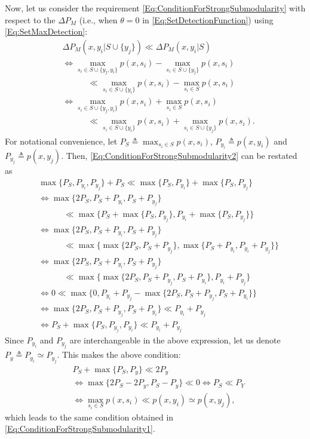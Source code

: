 \documentclass[letterpaper, 10 pt, conference]{ieeeconf}
\begin{document}
Now, let us consider the requirement \eqref{Eq:ConditionForStrongSubmodularity} with respect to the $\Delta P_M$ (i.e., when $\theta = 0$ in \eqref{Eq:SetDetectionFunction}) using \eqref{Eq:SetMaxDetection}:
\begin{align}
    &\Delta P_M(x,y_i \vert S \cup \{y_j\}) \ll \Delta P_M(x, y_i \vert S) \nonumber\\
    & \iff 
    \max_{s_i\in S\cup\{y_j,y_i\}} p(x,s_i) - \max_{s_i\in S\cup\{y_j\}} p(x,s_i) \nonumber \\
    &\quad \quad \quad \ll
    \max_{s_i\in S\cup\{y_i\}} p(x,s_i) - \max_{s_i\in S} p(x,s_i)\nonumber\\
    &\iff \max_{s_i\in S\cup\{y_j,y_i\}} p(x,s_i) + \max_{s_i\in S} p(x,s_i) 
    \nonumber\\ \label{Eq:ConditionForStrongSubmodularity2}
    &\quad \quad \quad \ll \max_{s_i\in S\cup\{y_i\}} p(x,s_i) + \max_{s_i\in S\cup\{y_j\}} p(x,s_i).
\end{align}
For notational convenience, let $P_S \triangleq \max_{s_i\in S} p(x,s_i)$, $P_{y_i}\triangleq p(x,y_i)$ and $P_{y_j}\triangleq p(x,y_j)$. Then, \eqref{Eq:ConditionForStrongSubmodularity2} can be restated as
\begin{align*}
    &\max\{P_S,P_{y_i},P_{y_j}\} + P_S \ll \max\{P_S,P_{y_i}\} + \max\{P_S,P_{y_j}\} \\
    &\iff 
    \max\{2P_S,P_S+P_{y_i},P_S+P_{y_j}\} \\ 
    &\quad \quad \quad \ll \max\{P_S+\max\{P_S,P_{y_j}\},P_{y_i}+\max\{P_S,P_{y_j}\}\}\\
    &\iff 
    \max\{2P_S,P_S+P_{y_i},P_S+P_{y_j}\} \\ 
    &\quad \quad \quad  \ll \max\{\max\{2P_S,P_S+P_{y_j}\},\max\{P_S+P_{y_i},P_{y_i}+P_{y_j}\}\}\\
    &\iff 
    \max\{2P_S,P_S+P_{y_i},P_S+P_{y_j}\} \\ 
    &\quad \quad \quad  \ll \max\{\max\{2P_S,P_S+P_{y_j},P_S+P_{y_i}\},P_{y_i}+P_{y_j}\}\\
    &\iff 
    0 \ll \max\{0,P_{y_i}+P_{y_j} - \max\{2P_S,P_S+P_{y_j},P_S+P_{y_i}\}\}\\
    &\iff \max\{2P_S,P_S+P_{y_j},P_S+P_{y_i}\} \ll  P_{y_i}+P_{y_j}\\
    &\iff P_S + \max\{P_S,P_{y_j},P_{y_i}\} \ll  P_{y_i}+P_{y_j}    
\end{align*}
Since $P_{y_i}$ and $P_{y_j}$ are interchangeable in the above expression, let us denote $P_y \triangleq P_{y_i} \simeq P_{y_j}$. This makes the above condition:
\begin{align}
&P_S + \max\{P_S,P_{y}\} \ll  2P_{y} \nonumber \\
&\iff     
\max\{2P_S-2P_y,P_S-P_y\} \ll 0  \iff P_S \ll P_Y  \nonumber \\
&\iff \max_{s_i \in S} p(x,s_i) \ll p(x,y_i) \simeq p(x,y_j), \nonumber
\end{align}
which leads to the same condition obtained in \eqref{Eq:ConditionForStrongSubmodularity1}.
\end{document}

